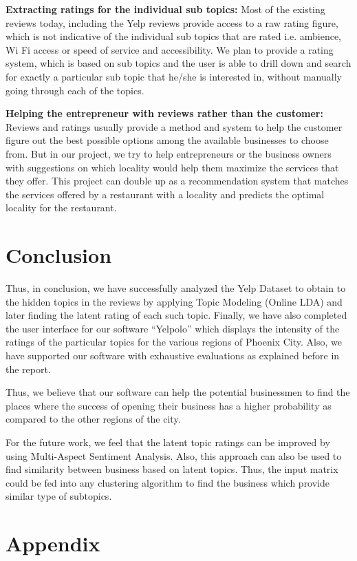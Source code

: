 \documentclass[12pt]{article} %
\begin{document}
\textbf{Extracting ratings for the individual sub topics:} Most of the existing reviews today, including the Yelp reviews provide access to a raw rating figure, which is not indicative of the individual sub topics that are rated i.e. ambience, Wi Fi access or speed of service and accessibility. We plan to provide a rating system, which is based on sub topics and the user is able to drill down and search for exactly a particular sub topic that he/she is interested in, without manually going through each of the topics.

\textbf{Helping the entrepreneur with reviews rather than the customer:} Reviews and ratings usually provide a method and system to help the customer figure out the best possible options among the available businesses to choose from. But in our project, we try to help entrepreneurs or the business owners with suggestions on which locality would help them maximize the services that they offer. This project can double up as a recommendation system that matches the services offered by a restaurant with a locality and predicts the optimal locality for the restaurant.


\section{Conclusion}

Thus, in conclusion, we have successfully analyzed the Yelp Dataset to obtain to the hidden topics in the reviews by applying Topic Modeling (Online LDA) and later finding the latent rating of each such topic. Finally, we have also completed the user interface for our software ``Yelpolo'' which displays the intensity of the ratings of the particular topics for the various regions of Phoenix City. Also, we have supported our software with exhaustive evaluations as explained before in the report.

Thus, we believe that our software can help the potential businessmen to find the places where the success of opening their business has a higher probability as compared to the other regions of the city. 

For the future work, we feel that the latent topic ratings can be improved by using Multi-Aspect Sentiment Analysis. Also, this approach can also be used to find similarity between business based on latent topics. Thus, the input matrix could be fed into any clustering algorithm to find the business which provide similar type of subtopics.

\section{Appendix}
\end{document}
